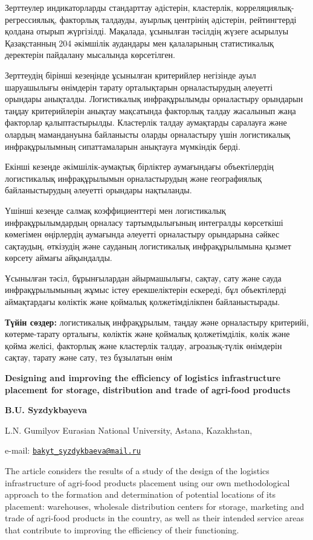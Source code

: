 Зерттеулер индикаторларды стандарттау әдістерін, кластерлік,
корреляциялық-регрессиялық, факторлық талдауды, ауырлық центрінің
әдістерін, рейтингтерді қолдана отырып жүргізілді. Мақалада, ұсынылған
тәсілдің жүзеге асырылуы Қазақстанның 204 әкімшілік аудандары мен
қалаларының статистикалық деректерін пайдалану мысалында көрсетілген.

Зерттеудің бірінші кезеңінде ұсынылған критерийлер негізінде ауыл
шаруашылығы өнімдерін тарату орталықтарын орналастырудың әлеуетті
орындары анықталды. Логистикалық инфрақұрылымды орналастыру орындарын
таңдау критерийлерін анықтау мақсатында факторлық талдау жасалынып жаңа
факторлар қалыптастырылды. Кластерлік талдау аумақтарды саралауға және
олардың мамандануына байланысты оларды орналастыру үшін логистикалық
инфрақұрылымның сипаттамаларын анықтауға мүмкіндік берді.

Екінші кезеңде әкімшілік-аумақтық бірліктер аумағындағы объектілердің
логистикалық инфрақұрылымын орналастырудың және географиялық
байланыстырудың әлеуетті орындары нақтыланды.

Үшінші кезеңде салмақ коэффициенттері мен логистикалық
инфрақұрылымдардың орналасу тартымдылығының интегралды көрсеткіші
көмегімен өңірлердің аумағында әлеуетті орналастыру орындарына сәйкес
сақтаудың, өткізудің және сауданың логистикалық инфрақұрылымына қызмет
көрсету аймағы айқындалды.

Ұсынылған тәсіл, бұрынғылардан айырмашылығы, сақтау, сату және сауда
инфрақұрылымының жұмыс істеу ерекшеліктерін ескереді, бұл объектілерді
аймақтардағы көліктік және қоймалық қолжетімділікпен байланыстырады.

{\bfseries Түйін сөздер:} логистикалық инфрақұрылым, таңдау және
орналастыру критерийі, көтерме-тарату орталығы, көліктік және қоймалық
қолжетімділік, көлік және қойма желісі, факторлық және кластерлік
талдау, агроазық-түлік өнімдерін сақтау, тарату және сату, тез бұзылатын
өнім

{\bfseries Designing and improving the efficiency of logistics
infrastructure placement for storage, distribution and trade of
agri-food products}

{\bfseries B.U. Syzdykbayeva}

L.N. Gumilyov Eurasian National University, Astana, Kazakhstan,

e-mail:
\href{mailto:bakyt_syzdykbaeva@mail.ru}{\nolinkurl{bakyt\_syzdykbaeva@mail.ru}}

The article considers the results of a study of the design of the
logistics infrastructure of agri-food products placement using our own
methodological approach to the formation and determination of potential
locations of its placement: warehouses, wholesale distribution centers
for storage, marketing and trade of agri-food products in the country,
as well as their intended service areas that contribute to improving the
efficiency of their functioning.

